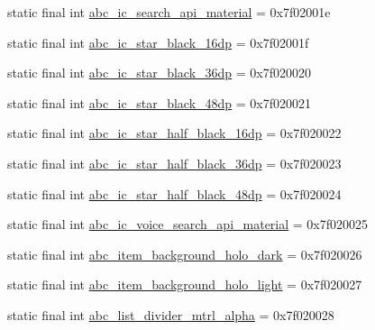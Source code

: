 \begin{CompactItemize}
\item 
static final int \hyperlink{classandroid_1_1support_1_1graphics_1_1drawable_1_1animated_1_1_r_1_1drawable_9950d40ae65294571a253aa1168d4dc5}{abc\_\-ic\_\-search\_\-api\_\-material} = 0x7f02001e
\item 
static final int \hyperlink{classandroid_1_1support_1_1graphics_1_1drawable_1_1animated_1_1_r_1_1drawable_31725b49324c51358e47830857f335fa}{abc\_\-ic\_\-star\_\-black\_\-16dp} = 0x7f02001f
\item 
static final int \hyperlink{classandroid_1_1support_1_1graphics_1_1drawable_1_1animated_1_1_r_1_1drawable_cb0cafef9aae76e00ed48c61203facbc}{abc\_\-ic\_\-star\_\-black\_\-36dp} = 0x7f020020
\item 
static final int \hyperlink{classandroid_1_1support_1_1graphics_1_1drawable_1_1animated_1_1_r_1_1drawable_795cca0a65d24bf1f84d83d705dd703e}{abc\_\-ic\_\-star\_\-black\_\-48dp} = 0x7f020021
\item 
static final int \hyperlink{classandroid_1_1support_1_1graphics_1_1drawable_1_1animated_1_1_r_1_1drawable_346658d2d51ab903679f114751ae4207}{abc\_\-ic\_\-star\_\-half\_\-black\_\-16dp} = 0x7f020022
\item 
static final int \hyperlink{classandroid_1_1support_1_1graphics_1_1drawable_1_1animated_1_1_r_1_1drawable_f535ac9f52ff55e6b708151ef685b328}{abc\_\-ic\_\-star\_\-half\_\-black\_\-36dp} = 0x7f020023
\item 
static final int \hyperlink{classandroid_1_1support_1_1graphics_1_1drawable_1_1animated_1_1_r_1_1drawable_89ab088534b97f614d095ccfee941040}{abc\_\-ic\_\-star\_\-half\_\-black\_\-48dp} = 0x7f020024
\item 
static final int \hyperlink{classandroid_1_1support_1_1graphics_1_1drawable_1_1animated_1_1_r_1_1drawable_99588604d95c3da5cb90826c07b0caac}{abc\_\-ic\_\-voice\_\-search\_\-api\_\-material} = 0x7f020025
\item 
static final int \hyperlink{classandroid_1_1support_1_1graphics_1_1drawable_1_1animated_1_1_r_1_1drawable_e5dc55607ea4a0763ab3bce956d04b6a}{abc\_\-item\_\-background\_\-holo\_\-dark} = 0x7f020026
\item 
static final int \hyperlink{classandroid_1_1support_1_1graphics_1_1drawable_1_1animated_1_1_r_1_1drawable_f45966c53e258146021f01a98ceb53fd}{abc\_\-item\_\-background\_\-holo\_\-light} = 0x7f020027
\item 
static final int \hyperlink{classandroid_1_1support_1_1graphics_1_1drawable_1_1animated_1_1_r_1_1drawable_c0556865963eab0c035632ad15323a0a}{abc\_\-list\_\-divider\_\-mtrl\_\-alpha} = 0x7f020028

\end{CompactItemize}
